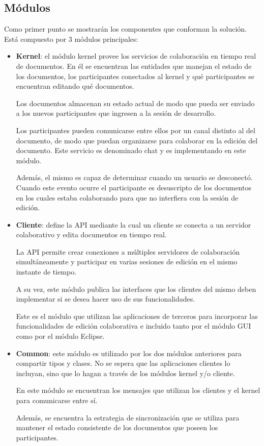 \documentclass[12pt,a4paper]{article}
\begin{document}
\subsection{Módulos}

Como primer punto se mostrarán los componentes que conforman la solución. Está compuesto por 3 módulos principales:

\begin{itemize}
	\item \textbf{Kernel}: el módulo kernel provee los servicios de colaboración en tiempo real de documentos. En él
	se encuentran las entidades que manejan el estado de los documentos, los participantes conectados al kernel y
	qué participantes se encuentran editando qué documentos.
	
	Los documentos almacenan su estado actual de modo que pueda ser enviado a los nuevos participantes que ingresen
	a la sesión de desarrollo.
	
	Los participantes pueden comunicarse entre ellos por un canal distinto al del documento, de modo que puedan
	organizarse	para colaborar en la edición del documento. Este servicio es denominado chat y es implementando en este módulo.
	
	Además, el mismo es capaz de determinar cuando un usuario se desconectó. Cuando este evento ocurre
	el participante es desuscripto de los documentos en los cuales estaba colaborando para que no interfiera
	con la sesión de edición.
	
	\item \textbf{Cliente}: define la API mediante la cual un cliente se conecta a un servidor colaborativo 
	y edita documentos en tiempo real. 

	La API permite crear conexiones a múltiples servidores de colaboración simultáneamente y participar
	en varias sesiones de edición en el mismo instante de tiempo.
	
	A su vez, este módulo publica las interfaces que los clientes del mismo deben implementar si se
	desea hacer uso de sus funcionalidades.
	
	Este es el módulo que utilizan las aplicaciones de terceros para incorporar las funcionalidades
	de edición colaborativa e incluido tanto por el módulo GUI como por el módulo Eclipse.

	\item \textbf{Common}: este módulo es utilizado por los dos módulos anteriores para compartir tipos
	y clases. No se espera que las aplicaciones clientes lo incluyan, sino que lo hagan
	a través de los módulos kernel y/o cliente.
	
	En este módulo se encuentran los mensajes que utilizan los clientes y el kernel para comunicarse entre sí.
	
	Además, se encuentra la estrategia de sincronización que se utiliza para mantener el estado consistente
	de los documentos que poseen los participantes.
\end{itemize}
\end{document}
